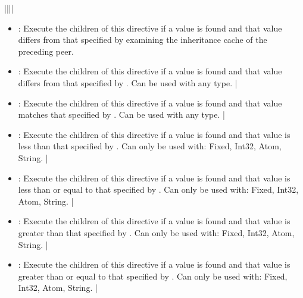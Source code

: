 \documentclass[letterpaper,12pt,english,openany,oneside]{sphinxmanual}
\begin{document}
\begin{savenotes}
\begin{tabular}[t]{||||}
\begin{itemize}
\item {} 
: Execute the children of this  directive if a value is found and that value differs from that specified by examining the inheritance cache of the preceding peer.

\item {} 
: Execute the children of this  directive if a value is found and that value differs from that specified by . Can be used with any type.                                         |

\item {} 
: Execute the children of this  directive if a value is found and that value matches that specified by . Can be used with any type.                                                |

\item {} 
: Execute the children of this  directive if a value is found and that value is less than that specified by . Can only be used with: Fixed, Int32, Atom, String.                 |

\item {} 
: Execute the children of this  directive if a value is found and that value is less than or equal to that specified by . Can only be used with: Fixed, Int32, Atom, String.    |

\item {} 
: Execute the children of this  directive if a value is found and that value is greater than that specified by . Can only be used with: Fixed, Int32, Atom, String.              |

\item {} 
: Execute the children of this  directive if a value is found and that value is greater than or equal to that specified by . Can only be used with: Fixed, Int32, Atom, String. |


\end{itemize}
\end{tabular}
\end{savenotes}
\end{document}
